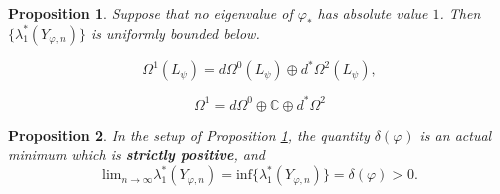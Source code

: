 \documentclass[10pt,a4paper]{amsart}
\newtheorem{prop}{Proposition}
\begin{document}
\begin{prop}\label{gap}
Suppose that no eigenvalue of $\varphi_*$ has absolute value $1$. Then $\{\lambda_1^*(Y_{\varphi,n})\}$ is uniformly bounded below.
\end{prop}

\begin{equation}\label{twistedhodge}
\Omega^1(L_{\psi})=d\Omega^0(L_{\psi})\oplus d^*\Omega^2(L_{\psi}),
\end{equation}

\begin{equation}\label{hodge}
\Omega^1=d\Omega^0 \oplus\mathbb{C}\oplus d^*\Omega^2
\end{equation}

\begin{prop}\label{mainprop}
In the setup of Proposition \ref{gap}, the quantity $\delta(\varphi)$ is an actual minimum which is \textbf{strictly positive}, and
\begin{equation*}
\mathrm{lim}_{n\rightarrow\infty} \lambda_1^*(Y_{\varphi,n})=\mathrm{inf}\{\lambda_1^*(Y_{\varphi,n})\}=\delta(\varphi)>0.
\end{equation*}
\end{prop}
\end{document}
